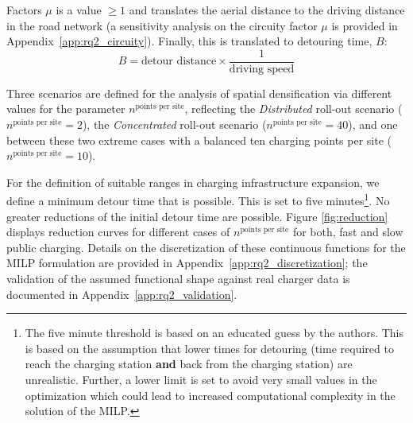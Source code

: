                 Factors  $\mu$ is a value $\geq 1$ and translates the aerial distance to the driving distance in the road network (a sensitivity analysis on the circuity factor $\mu$ is provided in Appendix~\ref{app:rq2_circuity}). Finally, this is translated to detouring time, $B$:
                \begin{equation}\label{equ:df_3}
                    B = \textrm{detour distance} \times \frac{1}{\textrm{driving speed}}
                \end{equation}

                Three scenarios are defined for the analysis of spatial densification via different values for the parameter $n^{\textrm{points per site}}$, reflecting the \textit{Distributed} roll-out scenario ($n^{\textrm{points per site}} = 2$), the \textit{Concentrated} roll-out scenario ($n^{\textrm{points per site}} = 40$), and one between these two extreme cases with a balanced ten charging points per site ($n^{\textrm{points per site}} = 10$). 

                For the definition of suitable ranges in charging infrastructure expansion, we define a minimum detour time that is possible. This is set to five minutes\footnote{The five minute threshold is based on an educated guess by the authors. This is based on the assumption that lower times for detouring (time required to reach the charging station \textbf{and} back from the charging station) are unrealistic. Further, a lower limit is set to avoid very small values in the optimization which could lead to increased computational complexity in the solution of the MILP.}. No greater reductions of the initial detour time are possible. Figure \ref{fig:reduction} displays reduction curves for different cases of $n^{\textrm{points per site}}$ for both, fast and slow public charging. Details on the discretization of these continuous functions for the MILP formulation are provided in Appendix~\ref{app:rq2_discretization}; the validation of the assumed functional shape against real charger data is documented in Appendix~\ref{app:rq2_validation}.
                
